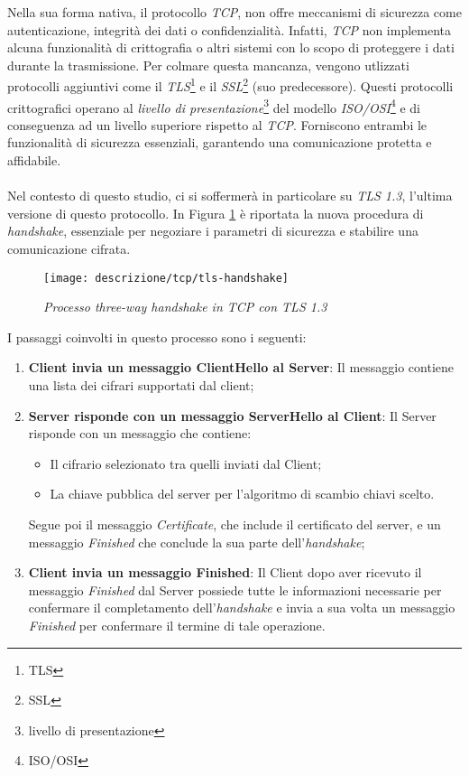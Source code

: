 \noindent Nella sua forma nativa, il protocollo \emph{TCP}, non offre meccanismi di sicurezza come autenticazione, integrità dei dati o confidenzialità. Infatti, \emph{TCP} non implementa alcuna funzionalità di crittografia o altri sistemi con lo scopo di proteggere i dati durante la trasmissione.
Per colmare questa mancanza, vengono utlizzati protocolli aggiuntivi come il \emph{TLS}\footnote{\gls{TLS}} e il \emph{SSL}\footnote{\gls{SSL}} (suo predecessore). Questi protocolli crittografici operano al \emph{livello di presentazione}\footnote{\gls{livello di presentazione}} del modello \emph{ISO/OSI}\footnote{\gls{ISO/OSI}} e di conseguenza ad un livello superiore rispetto al \emph{TCP}.
Forniscono entrambi le funzionalità di sicurezza essenziali, garantendo una comunicazione protetta e affidabile.
\\\\
Nel contesto di questo studio, ci si soffermerà in particolare su \emph{TLS 1.3}, l'ultima versione di questo protocollo. 
In Figura \ref{tlsHand} è riportata la nuova procedura di \emph{handshake}, essenziale per negoziare i parametri di sicurezza e stabilire una comunicazione cifrata.
\begin{figure}[!h]
    \centering
    \texttt{[image: descrizione/tcp/tls-handshake]}
    \caption{\emph{Processo three-way handshake in TCP con TLS 1.3}}
    \label{tlsHand}
\end{figure}

\noindent I passaggi coinvolti in questo processo sono i seguenti: 
\begin{enumerate}
    \item \textbf{Client invia un messaggio ClientHello al Server}: Il messaggio contiene una lista dei cifrari supportati dal client;
    \item \textbf{Server risponde con un messaggio ServerHello al Client}: Il Server risponde con un messaggio che contiene: 
    \begin{itemize}
        \item  Il cifrario selezionato tra quelli inviati dal Client;
        \item  La chiave pubblica del server per l'algoritmo di scambio chiavi scelto.
    \end{itemize}
    Segue poi il messaggio \emph{Certificate}, che include il certificato del server, e un messaggio \emph{Finished} che conclude la sua parte dell'\emph{handshake};
    \item \textbf{Client invia un messaggio Finished}: Il Client dopo aver ricevuto il messaggio \emph{Finished} dal Server possiede tutte le informazioni necessarie per confermare il completamento dell'\emph{handshake} e invia a sua volta un messaggio \emph{Finished} per confermare il termine di tale operazione.
\end{enumerate}

